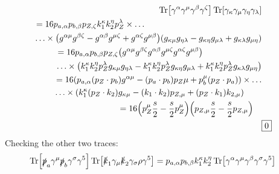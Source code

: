 \documentclass[12 pt,draft]{article}
\renewcommand{\b}[1]{\overline{#1}}
\begin{document}
\begin{problem}[ $\mu\b{\mu}\rightarrow f\b{f}$]
\begin{align}
			\Tr[\gamma^\alpha\gamma^\mu \gamma^\beta \gamma^\zeta]
			\Tr[\gamma_\kappa\gamma_\mu \gamma_\eta \gamma_\lambda]
			\\
			\begin{split}
				&=16p_{a,\alpha}p_{b,\beta}p_{Z,\zeta}k_{1}^{\kappa}k_{2}^{\eta}p_Z^{\lambda}
				\times\ldots\\&\ldots\times
				\qty(g^{\alpha \mu }g^{\beta \zeta }-g^{\alpha \beta }g^{\mu \zeta }+g^{\alpha \zeta }g^{\mu \beta })
				\qty(g_{\kappa\mu }g_{\eta\lambda }-g_{\kappa\eta }g_{\mu\lambda }+g_{\kappa\lambda }g_{\mu\eta })
			\end{split}
			\\
			\begin{split}
				&=16
				p_{a,\alpha}p_{b,\beta}p_{Z,\zeta}
				\qty(
					g^{\alpha \mu }g^{\beta \zeta }
					g^{\alpha \beta }g^{\mu \zeta }
					g^{\alpha \zeta }g^{\mu \beta }
					)
				\\&\ldots\times
				\qty(
					k_{1}^{\kappa}k_{2}^{\eta}p_Z^{\lambda}
					g_{\kappa\mu }g_{\eta\lambda }
					-k_{1}^{\kappa}k_{2}^{\eta}p_Z^{\lambda}
					g_{\kappa\eta }g_{\mu\lambda }
					+k_{1}^{\kappa}k_{2}^{\eta}p_Z^{\lambda}
					g_{\kappa\lambda }g_{\mu\eta }
					)
			\end{split}
			\\
			\begin{split}
				&=16
				\qty(
					p_{a,\alpha} \qty(p_Z\cdot p_b)
					g^{\alpha \mu}
					-\qty(p_a\cdot p_b)p_{Z}{\mu}
					+p_{b}^{\mu}\qty(p_Z\cdot p_a)
					)
				\times\ldots\\&\ldots\times
				\qty(
					k_{1}^{\kappa}\qty(p_Z\cdot k_2)
					g_{\kappa\mu }
					-\qty(k_1\cdot k_2)p_{Z,\mu}
					+\qty(p_Z\cdot k_1)k_{2,\mu}
					)
			\end{split}
			\\
			\begin{split}
				&=16
				\qty(
					p_{Z}^{\mu} \oo[s]{2}
					-\oo[s]{2}p_{Z}^{\mu}
					)
				\qty(
					p_{Z,\mu}\oo[s]{2}
					-\oo[s]{2}p_{Z,\mu}
					)
			\end{split}
			\\
			&\boxed{0}
		\end{align}
		Checking the other two traces:
		\newcommand\FF{\text{F.F.}}
		\begin{align}
			\Tr[\slsh{p}_a\gamma^\mu \slsh{p}_b\gamma^\sigma\gamma^5]
			\Tr[\slsh{k}_1\gamma_\mu \slsh{k}_2\gamma_\sigma\rho\gamma^5]
			&=p_{a,\alpha}p_{b,\beta}k_{1}^{\kappa}k_{2}^{\eta}
			\Tr[\gamma^\alpha\gamma^\mu \gamma^\beta \gamma^\sigma\gamma^5]

\end{align}
\end{problem}
\end{document}
